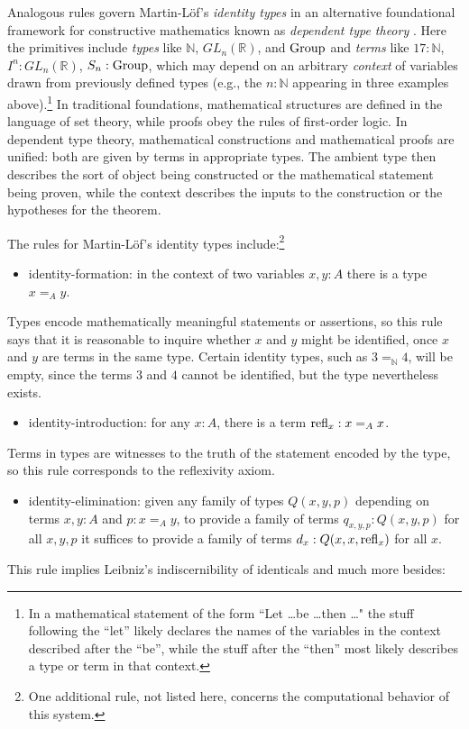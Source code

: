 \documentclass[11pt]{ctexart}
\theoremstyle{definition}
\theoremstyle{remark}
\numberwithin{equation}{section}
\newcommand{\refl}{\textup{refl}}
\newcommand{\Group}{\textup{Group}}
\newcommand{\NN}{\mathbb{N}}
\newcommand{\RR}{\mathbb{R}}
\newcommand{\1}{\mathbbe{1}}
\newcommand{\2}{\mathbbe{2}}
\newcommand{\3}{\mathbbe{3}}
\begin{document}
Analogous rules govern Martin-L\"{o}f's \emph{identity types} in an alternative foundational framework for constructive mathematics known as \emph{dependent type theory} \cite{PML}. Here the primitives include \emph{types} like $\NN$, $GL_n(\RR)$, and $\Group$ and \emph{terms} like $17 : \NN$, $I^n : GL_n(\RR)$, $S_n : \Group$, which may depend on an arbitrary \emph{context} of variables drawn from previously defined types (e.g., the $n :\NN$ appearing in three examples above).\footnote{In a mathematical statement of the form ``Let \ldots be  \ldots then \ldots" the stuff following the ``let'' likely declares the names of the variables in the context described after the ``be'', while the stuff after the ``then'' most likely describes a type or term in that context.} In traditional foundations, mathematical structures are defined in the language of set theory, while proofs obey the rules of first-order logic. In dependent type theory, mathematical constructions and mathematical proofs are unified: both are given by terms in appropriate types. The ambient type then describes the sort of object being constructed or the mathematical statement being proven, while the context describes the inputs to the construction or the hypotheses for the theorem.

The rules for Martin-L\"{o}f's identity types include:\footnote{One additional rule, not listed here, concerns the computational behavior of this system.}
\begin{itemize}
    \item identity-formation: in the context of two variables $x,y :A$ there is a type $x=_Ay$. 
\end{itemize}
Types encode mathematically meaningful statements or assertions, so this rule says that it is reasonable to inquire whether $x$ and $y$ might be identified, once $x$ and $y$ are terms in the same type. Certain identity types, such as $3=_\NN 4$, will be empty, since the terms $3$ and $4$ cannot be identified, but the type nevertheless exists.
\begin{itemize}
    \item identity-introduction: for any $x : A$, there is a term $\refl_x : x=_Ax$. 
\end{itemize}
Terms in types are witnesses to the truth of the statement encoded by the type, so this rule corresponds to the reflexivity axiom.
\begin{itemize}
    \item identity-elimination: given any family of types $Q(x,y,p)$ depending on terms $x, y : A$ and $p : x=_Ay$, to provide a family of terms $q_{x,y,p} : Q(x,y,p)$ for all $x,y,p$ it suffices to provide a family of terms $d_x : Q(x,x,\refl_x)$ for all $x$. 
\end{itemize}
This rule implies Leibniz's indiscernibility of identicals and much more besides:
\end{document}
